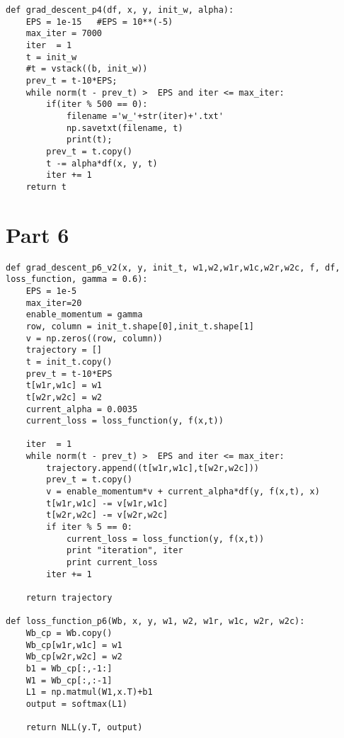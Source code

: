 \documentclass{article}
\begin{document}
\vspace*{2cm}


\Large\begin{lstlisting}[basicstyle=\large\ttfamily]
def grad_descent_p4(df, x, y, init_w, alpha):
    EPS = 1e-15   #EPS = 10**(-5)
    max_iter = 7000
    iter  = 1
    t = init_w
    #t = vstack((b, init_w)) 
    prev_t = t-10*EPS;
    while norm(t - prev_t) >  EPS and iter <= max_iter:
        if(iter % 500 == 0):
            filename ='w_'+str(iter)+'.txt'
            np.savetxt(filename, t)
            print(t);
        prev_t = t.copy()
        t -= alpha*df(x, y, t)
        iter += 1
    return t
\end{lstlisting}


\section*{Part 6}


\Large\begin{lstlisting}[basicstyle=\large\ttfamily]
def grad_descent_p6_v2(x, y, init_t, w1,w2,w1r,w1c,w2r,w2c, f, df, loss_function, gamma = 0.6):
    EPS = 1e-5
    max_iter=20
    enable_momentum = gamma
    row, column = init_t.shape[0],init_t.shape[1]
    v = np.zeros((row, column)) 
    trajectory = []
    t = init_t.copy()
    prev_t = t-10*EPS
    t[w1r,w1c] = w1
    t[w2r,w2c] = w2
    current_alpha = 0.0035
    current_loss = loss_function(y, f(x,t))
    
    iter  = 1
    while norm(t - prev_t) >  EPS and iter <= max_iter:
        trajectory.append((t[w1r,w1c],t[w2r,w2c]))
        prev_t = t.copy()
        v = enable_momentum*v + current_alpha*df(y, f(x,t), x)
        t[w1r,w1c] -= v[w1r,w1c]
        t[w2r,w2c] -= v[w2r,w2c]
        if iter % 5 == 0:
            current_loss = loss_function(y, f(x,t))
            print "iteration", iter
            print current_loss
        iter += 1
    
    return trajectory

def loss_function_p6(Wb, x, y, w1, w2, w1r, w1c, w2r, w2c):
    Wb_cp = Wb.copy()
    Wb_cp[w1r,w1c] = w1
    Wb_cp[w2r,w2c] = w2
    b1 = Wb_cp[:,-1:]
    W1 = Wb_cp[:,:-1]
    L1 = np.matmul(W1,x.T)+b1
    output = softmax(L1)
    
    return NLL(y.T, output)
\end{lstlisting}
\end{document}
